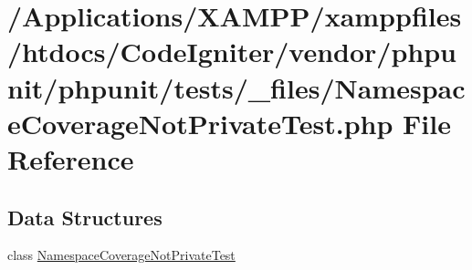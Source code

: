 \hypertarget{phpunit_2tests_2__files_2_namespace_coverage_not_private_test_8php}{}\section{/\+Applications/\+X\+A\+M\+P\+P/xamppfiles/htdocs/\+Code\+Igniter/vendor/phpunit/phpunit/tests/\+\_\+files/\+Namespace\+Coverage\+Not\+Private\+Test.php File Reference}
\label{phpunit_2tests_2__files_2_namespace_coverage_not_private_test_8php}
\subsection*{Data Structures}
\begin{DoxyCompactItemize}
\item 
class \mbox{\hyperlink{class_namespace_coverage_not_private_test}{Namespace\+Coverage\+Not\+Private\+Test}}
\end{DoxyCompactItemize}
